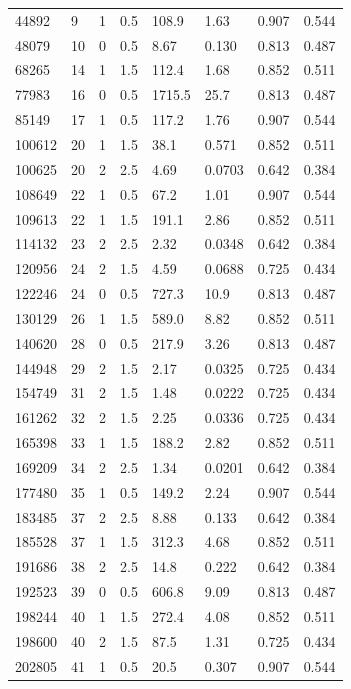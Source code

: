 \documentclass[preview]{standalone}
\begin{document}
{{\begin{tabular}{L{1.2cm}C{1.2cm} C{0.3cm}C{0.5cm} C{1.4cm}C{1.4cm} C{1.4cm}C{1.4cm}}
  44892  &     9  & 1     & 0.5 &  108.9  & 1.63  & 0.907 &  0.544   \\ 
  48079  &    10  & 0     & 0.5 &  8.67  & 0.130  & 0.813 &  0.487   \\ 
  68265  &    14  & 1     & 1.5 &  112.4  & 1.68  & 0.852 &  0.511   \\ 
  77983  &    16  & 0     & 0.5 &  1715.5  & 25.7  & 0.813 &  0.487   \\ 
  85149  &    17  & 1     & 0.5 &  117.2  & 1.76  & 0.907 &  0.544   \\ 
  100612  &    20  & 1     & 1.5 &  38.1  & 0.571  & 0.852 &  0.511   \\ 
  100625  &    20  & 2     & 2.5 &  4.69  & 0.0703  & 0.642 &  0.384   \\ 
  108649  &    22  & 1     & 0.5 &  67.2  & 1.01  & 0.907 &  0.544   \\ 
  109613  &    22  & 1     & 1.5 &  191.1  & 2.86  & 0.852 &  0.511   \\ 
  114132  &    23  & 2     & 2.5 &  2.32  & 0.0348  & 0.642 &  0.384   \\ 
  120956  &    24  & 2     & 1.5 &  4.59  & 0.0688  & 0.725 &  0.434   \\ 
  122246  &    24  & 0     & 0.5 &  727.3  & 10.9  & 0.813 &  0.487   \\ 
  130129  &    26  & 1     & 1.5 &  589.0  & 8.82  & 0.852 &  0.511   \\ 
  140620  &    28  & 0     & 0.5 &  217.9  & 3.26  & 0.813 &  0.487   \\ 
  144948  &    29  & 2     & 1.5 &  2.17  & 0.0325  & 0.725 &  0.434   \\ 
  154749  &    31  & 2     & 1.5 &  1.48  & 0.0222  & 0.725 &  0.434   \\ 
  161262  &    32  & 2     & 1.5 &  2.25  & 0.0336  & 0.725 &  0.434   \\ 
  165398  &    33  & 1     & 1.5 &  188.2  & 2.82  & 0.852 &  0.511   \\ 
  169209  &    34  & 2     & 2.5 &  1.34  & 0.0201  & 0.642 &  0.384   \\ 
  177480  &    35  & 1     & 0.5 &  149.2  & 2.24  & 0.907 &  0.544   \\ 
  183485  &    37  & 2     & 2.5 &  8.88  & 0.133  & 0.642 &  0.384   \\ 
  185528  &    37  & 1     & 1.5 &  312.3  & 4.68  & 0.852 &  0.511   \\ 
  191686  &    38  & 2     & 2.5 &  14.8  & 0.222  & 0.642 &  0.384   \\ 
  192523  &    39  & 0     & 0.5 &  606.8  & 9.09  & 0.813 &  0.487   \\ 
  198244  &    40  & 1     & 1.5 &  272.4  & 4.08  & 0.852 &  0.511   \\ 
  198600  &    40  & 2     & 1.5 &  87.5  & 1.31  & 0.725 &  0.434   \\ 
  202805  &    41  & 1     & 0.5 &  20.5  & 0.307  & 0.907 &  0.544   \\ 
\hline 
\end{tabular} 

}}
\end{document}
